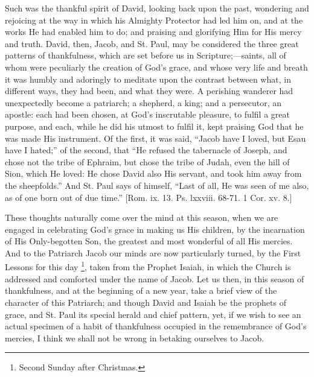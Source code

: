Such was the thankful spirit of David, looking back upon the past,
wondering and rejoicing at the way in which his Almighty Protector had
led him on, and at the works He had enabled him to do; and praising
and glorifying Him for His mercy and truth. David, then, Jacob, and
St. Paul, may be considered the three great patterns of thankfulness,
which are set before us in Scripture;—saints, all of whom were
peculiarly the creation of God's grace, and whose very life and breath
it was humbly and adoringly to meditate upon the contrast between
what, in different ways, they had been, and what they were. A
perishing wanderer had unexpectedly become a patriarch; a shepherd, a
king; and a persecutor, an apostle: each had been chosen, at God's
inscrutable pleasure, to fulfil a great purpose, and each, while he
did his utmost to fulfil it, kept praising God that he was made His
instrument. Of the first, it was said, ``Jacob have I loved, but
Esau have I hated;'' of the second, that ``He refused the
tabernacle of Joseph, and chose not the tribe of Ephraim, but chose
the tribe of Judah, even the hill of Sion, which He loved: He chose
David also His servant, and took him away from the sheepfolds.''
And St. Paul says of himself, ``Last of all, He was seen of me
also, as of one born out of due time.'' [Rom. ix. 13. Ps.
lxxviii. 68-71. 1 Cor. xv. 8.]

These thoughts naturally come over the mind at this season, when we
are engaged in celebrating God's grace in making us His children, by
the incarnation of His Only-begotten Son, the greatest and most
wonderful of all His mercies. And to the Patriarch Jacob our minds
are
now particularly turned, by the First Lessons for this day \footnote{Second Sunday after Christmas.}, taken from the Prophet Isaiah, in which the Church is
addressed and comforted under the name of Jacob. Let us then, in this
season of thankfulness, and at the beginning of a new year, take a
brief view of the character of this Patriarch; and though David and
Isaiah be the prophets of grace, and St. Paul its special herald and
chief pattern, yet, if we wish to see an actual specimen of a habit of
thankfulness occupied in the remembrance of God's mercies, I think we
shall not be wrong in betaking ourselves to Jacob.

